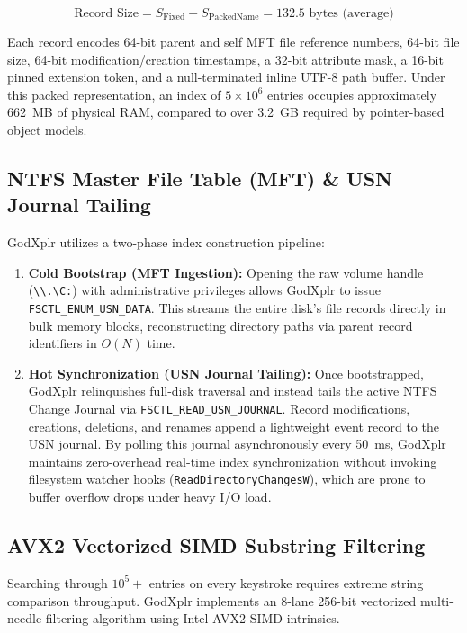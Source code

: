 \documentclass[conference]{IEEEtran}
\begin{document}
\begin{equation}
\label{eq:memory_density}
\text{Record Size} = S_{\text{Fixed}} + S_{\text{PackedName}} = 132.5\text{ bytes (average)}
\end{equation}

Each record encodes 64-bit parent and self MFT file reference numbers, 64-bit file size, 64-bit modification/creation timestamps, a 32-bit attribute mask, a 16-bit pinned extension token, and a null-terminated inline UTF-8 path buffer. Under this packed representation, an index of $5 \times 10^6$ entries occupies approximately 662~MB of physical RAM, compared to over 3.2~GB required by pointer-based object models.

\subsection{NTFS Master File Table (MFT) \& USN Journal Tailing}
GodXplr utilizes a two-phase index construction pipeline:
\begin{enumerate}
    \item \textbf{Cold Bootstrap (MFT Ingestion):} Opening the raw volume handle (\texttt{\textbackslash\textbackslash.\textbackslash C:}) with administrative privileges allows GodXplr to issue \texttt{FSCTL\_ENUM\_USN\_DATA}. This streams the entire disk's file records directly in bulk memory blocks, reconstructing directory paths via parent record identifiers in $O(N)$ time.
    \item \textbf{Hot Synchronization (USN Journal Tailing):} Once bootstrapped, GodXplr relinquishes full-disk traversal and instead tails the active NTFS Change Journal via \texttt{FSCTL\_READ\_USN\_JOURNAL}. Record modifications, creations, deletions, and renames append a lightweight event record to the USN journal. By polling this journal asynchronously every 50~ms, GodXplr maintains zero-overhead real-time index synchronization without invoking filesystem watcher hooks (\texttt{ReadDirectoryChangesW}), which are prone to buffer overflow drops under heavy I/O load.
\end{enumerate}

\subsection{AVX2 Vectorized SIMD Substring Filtering}
Searching through $10^5+$ entries on every keystroke requires extreme string comparison throughput. GodXplr implements an 8-lane 256-bit vectorized multi-needle filtering algorithm using Intel AVX2 SIMD intrinsics.
\end{document}
